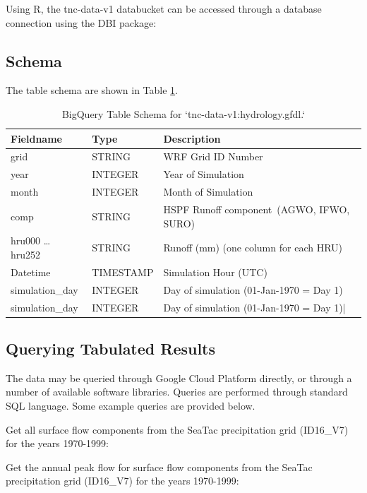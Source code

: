 \documentclass[
]{report}
\begin{document}
Using R, the tnc-data-v1 databucket can be accessed through a database connection using the DBI package:

\hypertarget{schema}{%
\subsection{Schema}\label{schema}}

The table schema are shown in Table \ref{tab:schemaTable}.

\begin{table}

\caption{\label{tab:schemaTable}BigQuery Table Schema for `tnc-data-v1:hydrology.gfdl.`}
\centering
\begin{tabular}[t]{l|l|l}
\hline
Fieldname & Type & Description\\
\hline
grid & STRING & WRF Grid ID Number\\
\hline
year & INTEGER & Year of Simulation\\
\hline
month & INTEGER & Month of Simulation\\
\hline
comp & STRING & HSPF Runoff component (AGWO, IFWO, SURO)\\
\hline
hru000 … hru252 & STRING & Runoff (mm) (one column for each HRU)\\
\hline
Datetime & TIMESTAMP & Simulation Hour (UTC)\\
\hline
simulation\_day & INTEGER & Day of simulation (01-Jan-1970 = Day 1)\\
\hline
simulation\_day & INTEGER & Day of simulation (01-Jan-1970 = Day 1)|\\
\hline
\end{tabular}
\end{table}

\hypertarget{querying-tabulated-results}{%
\subsection{Querying Tabulated Results}\label{querying-tabulated-results}}

The data may be queried through Google Cloud Platform directly, or through a number of available software libraries. Queries are performed through standard SQL language. Some example queries are provided below.

Get all surface flow components from the SeaTac precipitation grid (ID16\_V7) for the years 1970-1999:

Get the annual peak flow for surface flow components from the SeaTac precipitation grid (ID16\_V7) for the years 1970-1999:
\end{document}
